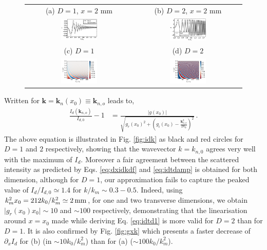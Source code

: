 \documentclass[
 reprint,
 amsmath,amssymb,
 aps,
]{revtex4-1}
\begin{document}
\begin{figure}[!]
\begin{tabular}{cc}
(a) $D=1$, $x=2$ mm
& (b) $D=2$, $x=2$ mm\\
\includegraphics[width=0.35\textwidth]{AD1.eps}
&\includegraphics[width=0.35\textwidth]{AD2.eps}\\
(c) $D=1$ 
& (d) $D=2$\\
\includegraphics[width=0.35\textwidth]{AxkD1.png}
&\includegraphics[width=0.35\textwidth]{AxkD2.png}
\end{tabular}
\caption{ \label{fig:a} }
\end{figure}
Written for  $\mathbf{k}=\mathbf{k}_n(x_0)\equiv \mathbf{k}_{n,o}$ leads to,
\begin{align}
    \frac{I_d(\mathbf{k}_{n,o})}{I_{d,0}}-1& =  
   \frac{\vert g(x_0) \vert  }
    {\sqrt{g_r(x_0)^2+\left( g_i(x_0) -\frac{\mathbf{k}_{n,o}^2 }{2k_0}\right)^2}} \, . \label{eq:idtdamp}
\end{align}
The  above equation is illustrated in Fig. \ref{fig:idk} as black and red circles for $D=1$ and $2$ respectively, showing that the wavevector  $k=k_{n,0}$ agrees very well with the maximum of $I_d$. Moreover a fair agreement between  the scattered intensity as predicted by  Eqs. \eqref{eq:dxidkdf}   and  \eqref{eq:idtdamp}  is obtained for both dimension, although for $D=1$, our approximation fails to capture the peaked value of $ I_d/I_{d,0}\simeq 1.4 $ for $k/k_m\sim 0.3-0.5$. 
Indeed, using  $k_m^2x_0=212k_0/k_m^2\simeq 2\,\rm mm$, for  one and  two transverse dimensions,  we obtain  $\vert g_r(x_0)x_0 \vert  \sim 10 $  and $\sim 100$ respectively, demonstrating that the linearisation around $x=x_0$ made  while deriving Eq. \eqref{eq:idtd1} is more valid  for $D=2$ than for  $D=1$. It is also confirmed by Fig. \ref{fig:gxk} which presents a faster decrease of $\partial_x I_d$ for  (b) (in $\sim 10k_0/k_m^2$) than for  (a) ($\sim 100k_0/k_m^2$).
\end{document}
